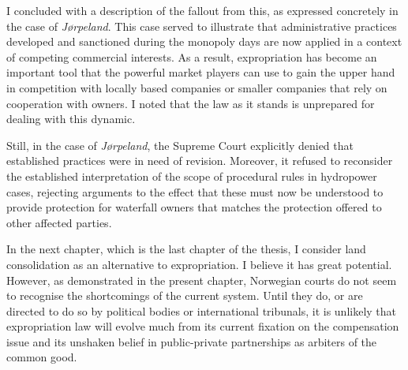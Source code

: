 I concluded with a description of the fallout from this, as expressed concretely in the case of {\it Jørpeland}. This case served to illustrate that administrative practices developed and sanctioned during the monopoly days are now applied in a context of competing commercial interests. As a result,  expropriation has become an important tool that the powerful market players can use to gain the upper hand in competition with locally based companies or smaller companies that rely on cooperation with owners. I noted that the law as it stands is unprepared for dealing with this dynamic. 

Still, in the case of {\it Jørpeland}, the Supreme Court explicitly denied that established practices were in need of revision. Moreover, it refused to reconsider the established interpretation of the scope of procedural rules in hydropower cases, rejecting arguments to the effect that these must now be understood to provide protection for waterfall owners that matches the protection offered to other affected parties.


In the next chapter, which is the last chapter of the thesis, I consider land consolidation as an alternative to expropriation. I believe it has great potential. However, as demonstrated in the present chapter, Norwegian courts do not seem to recognise the shortcomings of the current system. Until they do, or are directed to do so by political bodies or international tribunals, it is unlikely that expropriation law will evolve much from its current fixation on the compensation issue and its unshaken belief in public-private partnerships as arbiters of the common good.
